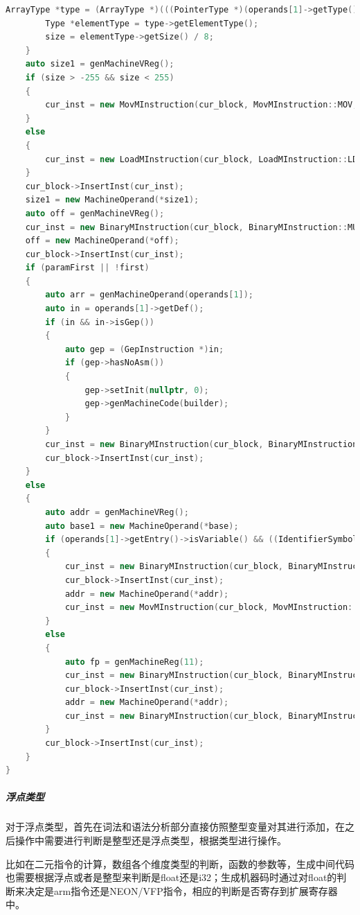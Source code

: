 \documentclass[UTF8,a4paper,10pt]{ctexart}
\begin{document}
\begin{lstlisting}[title = 数组的目标代码生成, language = c++]
        ArrayType *type = (ArrayType *)(((PointerType *)(operands[1]->getType()))->getType());
        Type *elementType = type->getElementType();
        size = elementType->getSize() / 8;
    }
    auto size1 = genMachineVReg();
    if (size > -255 && size < 255)
    {
        cur_inst = new MovMInstruction(cur_block, MovMInstruction::MOV, size1, genMachineImm(size));
    }
    else
    {
        cur_inst = new LoadMInstruction(cur_block, LoadMInstruction::LDR, size1, genMachineImm(size));
    }
    cur_block->InsertInst(cur_inst);
    size1 = new MachineOperand(*size1);
    auto off = genMachineVReg();
    cur_inst = new BinaryMInstruction(cur_block, BinaryMInstruction::MUL, off, idx, size1);
    off = new MachineOperand(*off);
    cur_block->InsertInst(cur_inst);
    if (paramFirst || !first)
    {
        auto arr = genMachineOperand(operands[1]);
        auto in = operands[1]->getDef();
        if (in && in->isGep())
        {
            auto gep = (GepInstruction *)in;
            if (gep->hasNoAsm())
            {
                gep->setInit(nullptr, 0);
                gep->genMachineCode(builder);
            }
        }
        cur_inst = new BinaryMInstruction(cur_block, BinaryMInstruction::ADD, dst, arr, off);
        cur_block->InsertInst(cur_inst);
    }
    else
    {
        auto addr = genMachineVReg();
        auto base1 = new MachineOperand(*base);
        if (operands[1]->getEntry()->isVariable() && ((IdentifierSymbolEntry *)(operands[1]->getEntry()))->isGlobal())
        {
            cur_inst = new BinaryMInstruction(cur_block, BinaryMInstruction::ADD, addr, base1, off);
            cur_block->InsertInst(cur_inst);
            addr = new MachineOperand(*addr);
            cur_inst = new MovMInstruction(cur_block, MovMInstruction::MOV, dst, addr);
        }
        else
        {
            auto fp = genMachineReg(11);
            cur_inst = new BinaryMInstruction(cur_block, BinaryMInstruction::ADD, addr, fp, base1);
            cur_block->InsertInst(cur_inst);
            addr = new MachineOperand(*addr);
            cur_inst = new BinaryMInstruction(cur_block, BinaryMInstruction::ADD, dst, addr, off);
        }
        cur_block->InsertInst(cur_inst);
    }
}
\end{lstlisting}

\subparagraph{浮点类型}
对于浮点类型，首先在词法和语法分析部分直接仿照整型变量对其进行添加，在之后操作中需要进行判断是整型还是浮点类型，根据类型进行操作。

比如在二元指令的计算，数组各个维度类型的判断，函数的参数等，生成中间代码也需要根据浮点或者是整型来判断是float还是i32；生成机器码时通过对float的判断来决定是arm指令还是NEON/VFP指令，相应的判断是否寄存到扩展寄存器中。
\end{document}
